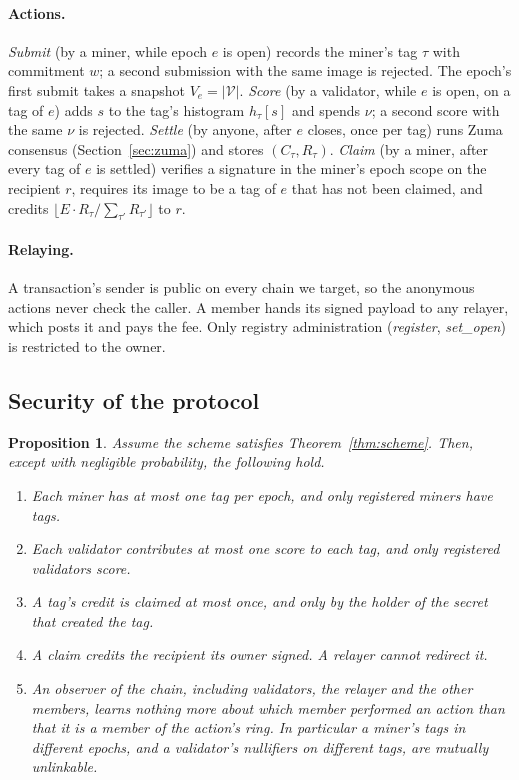 \documentclass[11pt]{article}
\newtheorem{proposition}[theorem]{Proposition}
\theoremstyle{remark}
\newcommand{\tg}{\tau}
\begin{document}
\paragraph{Actions.} \emph{Submit} (by a miner, while epoch $e$ is open) records the miner's tag $\tg$ with commitment $w$; a second submission with the same image is rejected. The epoch's first submit takes a snapshot $V_e = |\mathcal{V}|$. \emph{Score} (by a validator, while $e$ is open, on a tag of $e$) adds $s$ to the tag's histogram $h_\tg[s]$ and spends $\nu$; a second score with the same $\nu$ is rejected. \emph{Settle} (by anyone, after $e$ closes, once per tag) runs Zuma consensus (Section~\ref{sec:zuma}) and stores $(C_\tg, R_\tg)$. \emph{Claim} (by a miner, after every tag of $e$ is settled) verifies a signature in the miner's epoch scope on the recipient $r$, requires its image to be a tag of $e$ that has not been claimed, and credits $\lfloor E\cdot R_\tg/\sum_{\tg'} R_{\tg'}\rfloor$ to $r$.

\paragraph{Relaying.} A transaction's sender is public on every chain we target, so the anonymous actions never check the caller. A member hands its signed payload to any relayer, which posts it and pays the fee. Only registry administration (\emph{register}, \emph{set\_open}) is restricted to the owner.

\subsection{Security of the protocol}\label{sec:security}

\begin{proposition}\label{prop:protocol}
Assume the scheme satisfies Theorem~\ref{thm:scheme}. Then, except with negligible probability, the following hold.
\begin{enumerate}
\item[(P1)] Each miner has at most one tag per epoch, and only registered miners have tags.
\item[(P2)] Each validator contributes at most one score to each tag, and only registered validators score.
\item[(P3)] A tag's credit is claimed at most once, and only by the holder of the secret that created the tag.
\item[(P4)] A claim credits the recipient its owner signed. A relayer cannot redirect it.
\item[(P5)] An observer of the chain, including validators, the relayer and the other members, learns nothing more about which member performed an action than that it is a member of the action's ring. In particular a miner's tags in different epochs, and a validator's nullifiers on different tags, are mutually unlinkable.
\end{enumerate}
\end{proposition}
\end{document}
